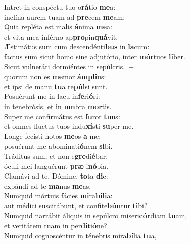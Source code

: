 \evenverse Intret in conspéctu tuo o\textbf{rá}tio \textbf{me}a:~\*\\
\evenverse inclína aurem tuam ad \textbf{pre}cem \textbf{me}am:\\
\oddverse Quia repléta est malis \textbf{á}nima \textbf{me}a:~\*\\
\oddverse et vita mea inférno ap\textbf{pro}pin\textbf{quá}vit.\\
\evenverse Æstimátus sum cum descendénti\textbf{bus} in \textbf{la}cum:~\*\\
\evenverse factus sum sicut homo sine adjutório, inter \textbf{mór}tuos \textbf{li}ber.\\
\oddverse Sicut vulneráti dormiéntes in sepúlcris,~+\\
\oddverse  quorum non es \textbf{me}mor \textbf{ám}\textbf{pli}us:~\*\\
\oddverse et ipsi de manu \textbf{tu}a re\textbf{púl}si sunt.\\
\evenverse Posuérunt me in lacu in\textbf{fe}ri\textbf{ó}ri:~\*\\
\evenverse in tenebrósis, et in \textbf{um}bra \textbf{mor}tis.\\
\oddverse Super me confirmátus est \textbf{fu}ror \textbf{tu}us:~\*\\
\oddverse et omnes fluctus tuos indu\textbf{xí}sti \textbf{su}per me.\\
\evenverse Longe fecísti notos \textbf{me}os \textbf{a} me:~\*\\
\evenverse posuérunt me abominati\textbf{ó}nem \textbf{si}bi.\\
\oddverse Tráditus sum, et non e\textbf{gre}di\textbf{é}bar:~\*\\
\oddverse óculi mei languérunt \textbf{præ} i\textbf{nó}pia.\\
\evenverse Clamávi ad te, Dómine, \textbf{to}ta \textbf{di}e:~\*\\
\evenverse expándi ad te \textbf{ma}nus \textbf{me}as.\\
\oddverse Numquid mórtuis fácies \textbf{mi}ra\textbf{bí}\textbf{li}a:~\*\\
\oddverse aut médici suscitábunt, et confite\textbf{bún}tur \textbf{ti}bi?\\
\evenverse Numquid narrábit áliquis in sepúlcro miseri\textbf{cór}diam \textbf{tu}am,~\*\\
\evenverse et veritátem tuam in per\textbf{di}ti\textbf{ó}ne?\\
\oddverse Numquid cognoscéntur in ténebris mira\textbf{bí}lia \textbf{tu}a,~\*\\
